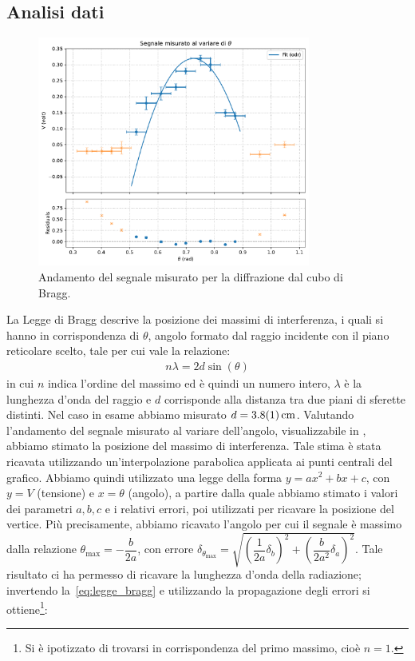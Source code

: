 \documentclass[a4paper]{article}
\begin{document}
\subsection{Analisi dati}
\begin{figure}[htbp]
	\centering
	\includegraphics[width=0.8\textwidth]{grafici/bragg.pdf}
	\caption{Andamento del segnale misurato per la diffrazione dal cubo di Bragg.}
	\label{fig:grafico_bragg}
\end{figure}
La Legge di Bragg descrive la posizione dei massimi di interferenza, i quali si hanno in corrispondenza di $\theta$, angolo formato dal raggio incidente con il piano reticolare scelto, tale per cui vale la relazione:
\begin{align}
    n\lambda=2d \sin(\theta)
    \label{eq:legge_bragg} 
\end{align}
in cui $n$ indica l'ordine del massimo ed è quindi un numero intero, $\lambda$ è la lunghezza d'onda del raggio e $d$ corrisponde alla distanza tra due piani di sferette distinti. Nel caso in esame abbiamo misurato $d = \SI{3.8 +- 0.1}{\centi\metre}$.
Valutando l'andamento del segnale misurato al variare dell'angolo, visualizzabile in , abbiamo stimato la posizione del massimo di interferenza. Tale stima è stata ricavata utilizzando un'interpolazione parabolica applicata ai punti centrali del grafico. Abbiamo quindi utilizzato una legge della forma $y = ax^2 + bx +c$, con $y=V$ (tensione) e $x=\theta$ (angolo), a partire dalla quale abbiamo stimato i valori dei parametri $a, b, c$ e i relativi errori, poi utilizzati per ricavare la posizione del vertice. Più precisamente, abbiamo ricavato l'angolo per cui il segnale è massimo dalla relazione $\theta_{\text{max}} = -\dfrac{b}{2a}$, con errore $\delta_{\theta_{\text{max}}} = \sqrt{\left(\dfrac{1}{2a}\delta_b\right)^2 + \left(\dfrac{b}{2a^2}\delta_a\right)^2}$. Tale risultato ci ha permesso di ricavare la lunghezza d'onda della radiazione; invertendo la~\cref{eq:legge_bragg} e utilizzando la propagazione degli errori si ottiene\footnote{Si è ipotizzato di trovarsi in corrispondenza del primo massimo, cioè $n=1$.}:
\end{document}

